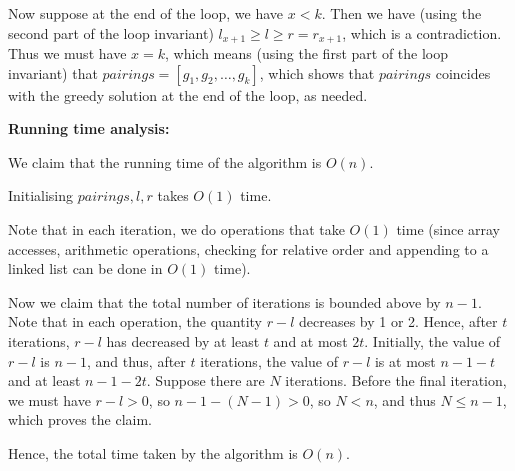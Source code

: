 \documentclass[answers]{exam}
\begin{document}
\begin{questions}
\begin{solution}
Now suppose at the end of the loop, we have $x < k$. Then we have (using the second part of the loop invariant) $l_{x + 1} \ge l \ge r = r_{x + 1}$, which is a contradiction. Thus we must have $x = k$, which means (using the first part of the loop invariant) that $\mathit{pairings} = \left[ g_1, g_2, \dots, g_k \right]$, which shows that $pairings$ coincides with the greedy solution at the end of the loop, as needed.


\textbf{Running time analysis:}

We claim that the running time of the algorithm is $O(n)$.

Initialising $\mathit{pairings}, l, r$ takes $O(1)$ time.

Note that in each iteration, we do operations that take $O(1)$ time (since array accesses, arithmetic operations, checking for relative order and appending to a linked list can be done in $O(1)$ time).

Now we claim that the total number of iterations is bounded above by $n - 1$. Note that in each operation, the quantity $r - l$ decreases by 1 or 2. Hence, after $t$ iterations, $r - l$ has decreased by at least $t$ and at most $2t$. Initially, the value of $r - l$ is $n - 1$, and thus, after $t$ iterations, the value of $r - l$ is at most $n - 1 - t$ and at least $n - 1 - 2t$. Suppose there are $N$ iterations. Before the final iteration, we must have $r - l > 0$, so $n - 1 - (N - 1) > 0$, so $N < n$, and thus $N \le n - 1$, which proves the claim.

Hence, the total time taken by the algorithm is $O(n)$.

\end{solution}


\end{questions}
\end{document}
